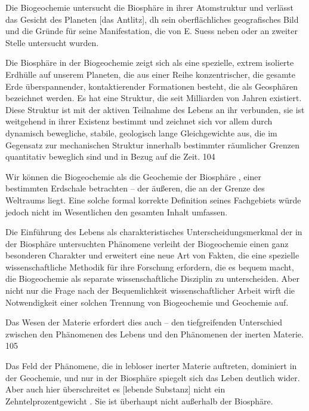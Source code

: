 \documentclass[11pt,a4paper]{book}
\begin{document}
Die Biogeochemie untersucht die Biosphäre in ihrer Atomstruktur und verlässt das Gesicht des Planeten [das Antlitz], dh sein oberflächliches geografisches Bild und die Gründe für seine Manifestation, die von E. Suess neben oder an zweiter Stelle untersucht wurden.



Die Biosphäre in der Biogeochemie zeigt sich als eine spezielle, extrem isolierte Erdhülle auf unserem Planeten, die aus einer Reihe konzentrischer, die gesamte Erde überspannender, kontaktierender Formationen besteht, die als Geosphären bezeichnet werden. Es hat eine Struktur, die seit Milliarden von Jahren existiert. Diese Struktur ist mit der aktiven Teilnahme des Lebens an ihr verbunden, sie ist weitgehend in ihrer Existenz bestimmt und zeichnet sich vor allem durch dynamisch bewegliche, stabile, geologisch lange Gleichgewichte aus, die im Gegensatz zur mechanischen Struktur innerhalb bestimmter räumlicher Grenzen quantitativ beweglich sind und in Bezug auf die Zeit. 104



Wir können die Biogeochemie als die Geochemie der Biosphäre , einer bestimmten Erdschale betrachten -- der äußeren, die an der Grenze des Weltraums liegt. Eine solche formal korrekte Definition seines Fachgebiets würde jedoch nicht im Wesentlichen den gesamten Inhalt umfassen.



Die Einführung des Lebens als charakteristisches Unterscheidungsmerkmal der in der Biosphäre untersuchten Phänomene verleiht der Biogeochemie einen ganz besonderen Charakter und erweitert eine neue Art von Fakten, die eine spezielle wissenschaftliche Methodik für ihre Forschung erfordern, die es bequem macht, die Biogeochemie als separate wissenschaftliche Disziplin zu unterscheiden. Aber nicht nur die Frage nach der Bequemlichkeit wissenschaftlicher Arbeit wirft die Notwendigkeit einer solchen Trennung von Biogeochemie und Geochemie auf.



Das Wesen der Materie erfordert dies auch -- den tiefgreifenden Unterschied zwischen den Phänomenen des Lebens und den Phänomenen der inerten Materie. 105



Das Feld der Phänomene, die in lebloser inerter Materie auftreten, dominiert in der Geochemie, und nur in der Biosphäre spiegelt sich das Leben deutlich wider. Aber auch hier überschreitet es [lebende Substanz] nicht ein Zehntelprozentgewicht . Sie ist überhaupt nicht außerhalb der Biosphäre.
\end{document}
